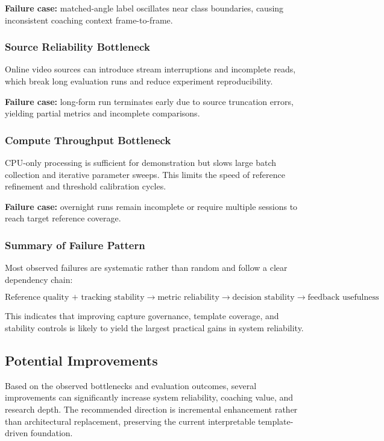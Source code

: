 \documentclass[12pt]{article}
\begin{document}
{\textbf{Failure case:} matched-angle label oscillates near class boundaries, causing inconsistent coaching context frame-to-frame.

\subsubsection{Source Reliability Bottleneck}

Online video sources can introduce stream interruptions and incomplete reads, which break long evaluation runs and reduce experiment reproducibility.

\textbf{Failure case:} long-form run terminates early due to source truncation errors, yielding partial metrics and incomplete comparisons.

\subsubsection{Compute Throughput Bottleneck}

CPU-only processing is sufficient for demonstration but slows large batch collection and iterative parameter sweeps. This limits the speed of reference refinement and threshold calibration cycles.

\textbf{Failure case:} overnight runs remain incomplete or require multiple sessions to reach target reference coverage.

\subsubsection{Summary of Failure Pattern}

Most observed failures are systematic rather than random and follow a clear dependency chain:

\[
\text{Reference quality + tracking stability} \rightarrow \text{metric reliability} \rightarrow \text{decision stability} \rightarrow \text{feedback usefulness}
\]

This indicates that improving capture governance, template coverage, and stability controls is likely to yield the largest practical gains in system reliability.

\subsection{Potential Improvements}

Based on the observed bottlenecks and evaluation outcomes, several improvements can significantly increase system reliability, coaching value, and research depth. The recommended direction is incremental enhancement rather than architectural replacement, preserving the current interpretable template-driven foundation.

}
\end{document}
